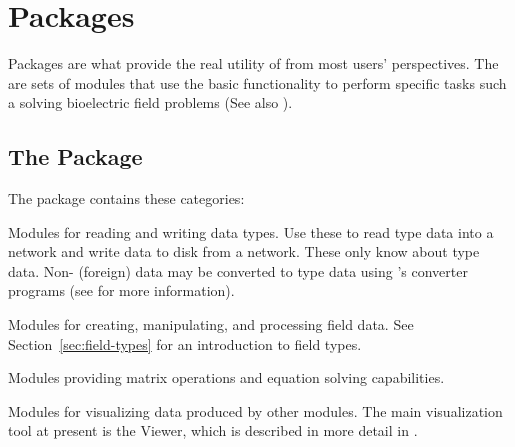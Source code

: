 %
%
%
%
%
%

\section{Packages}
\label{sec:packages}

Packages are what provide the real utility of \SR{} from most users'
perspectives.  The are sets of modules that use the basic \SR{}
functionality to perform specific tasks such a solving bioelectric
field problems (See also ).

\subsection{The \sr{} Package}
\label{sec:srpackage}

The \sr{} package contains these categories:

\begin{description}
 Modules for reading and writing \sr{} data
  types.  Use these to read \sr{} type data into a network and write
  data to disk from a network.  These only know about \sr{} type data.
  Non-\sr{} (foreign) data may be converted to \sr{} type data using
  \sr{}'s converter programs (see  for more information).
  
 Modules for creating, manipulating, and
  processing field data.  See Section~\ref{sec:field-types} for an
  introduction to \sr{} field types.
  
 Modules providing matrix operations and
  equation solving capabilities.
  
 Modules for visualizing data produced by
  other modules.  The main visualization tool at present
  is the Viewer, which is described in more detail in
  .
\end{description}

